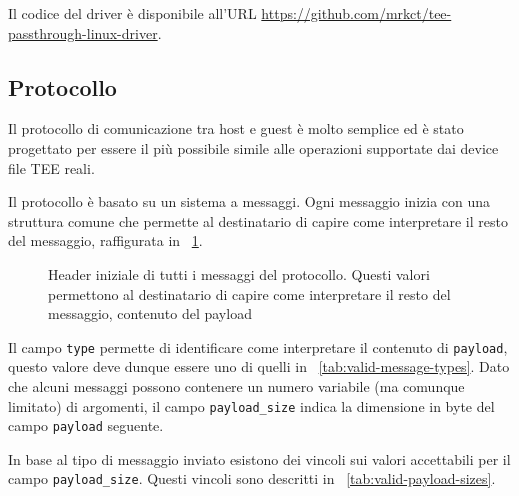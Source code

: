 \documentclass[12pt,italian]{report}
\begin{document}
\bigbreak \noindent

Il codice del driver è disponibile all'URL \url{https://github.com/mrkct/tee-passthrough-linux-driver}.

\subsection{Protocollo}
\label{subsection:protocollo}
Il protocollo di comunicazione tra host e guest è molto semplice ed è
stato progettato per essere il più possibile simile alle operazioni
supportate dai device file TEE reali.

Il protocollo è basato su un sistema a messaggi. Ogni messaggio inizia
con una struttura comune che permette al destinatario di capire come
interpretare il resto del messaggio, raffigurata in
\figurename~\ref{fig:message-wrapper-schema}.

\begin{figure}
    \centering
    \caption{
        Header iniziale di tutti i messaggi del protocollo.
        Questi valori permettono al destinatario di capire come interpretare
        il resto del messaggio, contenuto del payload
    }
    \label{fig:message-wrapper-schema}
\end{figure}

Il campo \texttt{type} permette di identificare come interpretare il
contenuto di \texttt{payload}, questo valore deve dunque essere uno di quelli
in \tablename~\ref{tab:valid-message-types}.
Dato che alcuni messaggi possono contenere un numero variabile
(ma comunque limitato) di argomenti, il campo \texttt{payload\_size} indica
la dimensione in byte del campo \texttt{payload} seguente.

In base al tipo di messaggio inviato esistono dei vincoli sui valori
accettabili per il campo \texttt{payload\_size}.
Questi vincoli sono descritti in \tablename~\ref{tab:valid-payload-sizes}.
\end{document}
